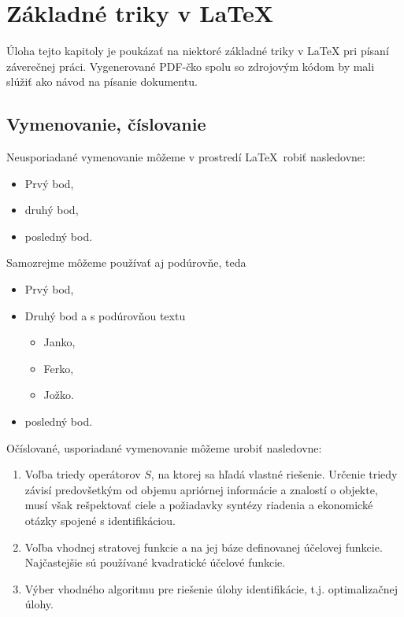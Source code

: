 \chapter{Základné triky v LaTeX}
\label{jablka}


Úloha tejto kapitoly je poukázať na niektoré základné triky v LaTeX pri písaní záverečnej práci. Vygenerované PDF-čko spolu so zdrojovým kódom by mali slúžiť ako návod na písanie dokumentu.


\section{Vymenovanie, číslovanie}

Neusporiadané vymenovanie môžeme v prostredí \LaTeX\ robiť nasledovne:
\begin{itemize}
	\item Prvý bod,
	\item druhý bod,
	\item posledný bod.
\end{itemize}
Samozrejme môžeme používať aj podúrovňe, teda
\begin{itemize}
	\item Prvý bod,
	\item Druhý bod a s podúrovňou textu
	\begin{itemize}
		\item Janko,
		\item Ferko,
		\item Jožko.
	\end{itemize}
	\item posledný bod.
\end{itemize}

Očíslované, usporiadané vymenovanie môžeme urobiť nasledovne:
\begin{enumerate}
	\item Voľba triedy operátorov $S$, na ktorej sa hľadá vlastné riešenie. Určenie triedy závisí predovšetkým od objemu apriórnej informácie a znalostí o objekte, musí však rešpektovať ciele a požiadavky syntézy riadenia a ekonomické otázky spojené s identifikáciou.
	\item Voľba vhodnej stratovej funkcie a na jej báze definovanej účelovej funkcie. Najčastejšie sú používané kvadratické účelové funkcie.
	\item Výber vhodného algoritmu pre riešenie úlohy identifikácie, t.j. optimalizačnej úlohy.
\end{enumerate}


